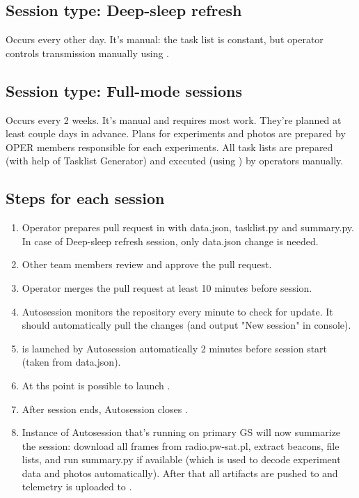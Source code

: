 \subsection{Session type: Deep-sleep refresh}
Occurs every other day. It's manual: the task list is constant, but operator controls transmission manually using .

\subsection{Session type: Full-mode sessions}
Occurs every 2 weeks. It's manual and requires most work. They're planned at least couple days in advance. Plans for experiments and photos are prepared by OPER members responsible for each experiments. All task lists are prepared (with help of Tasklist Generator) and executed (using ) by operators manually.

\subsection{Steps for each session}

\begin{enumerate}
    \item Operator prepares pull request in  with data.json, tasklist.py and summary.py. In case of Deep-sleep refresh session, only data.json change is needed.
    \item Other team members review and approve the pull request.
    \item Operator merges the pull request at least 10 minutes before session.
    \item Autosession monitors the repository every minute to check for update. It should automatically pull the changes (and output "New session" in console).
    \item {} is launched by Autosession automatically 2 minutes before session start (taken from data.json).
    \item At ths point is possible to launch .
    \item After session ends, Autosession closes .
    \item Instance of Autosession that's running on primary GS will now summarize the session: download all frames from radio.pw-sat.pl, extract beacons, file lists, and run summary.py if available (which is used to decode experiment data and photos automatically). After that all artifacts are pushed to  and telemetry is uploaded to .
\end{enumerate}


